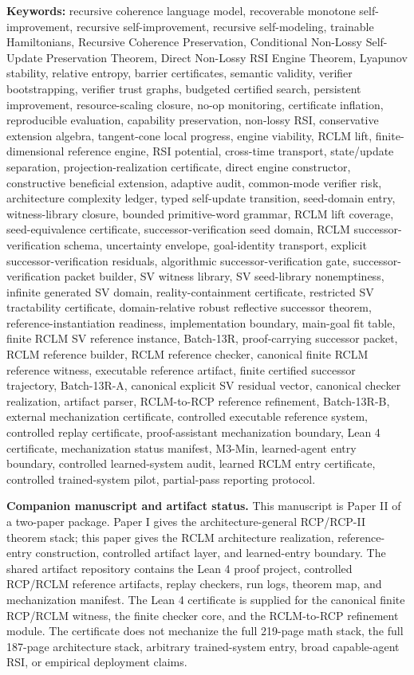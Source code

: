 \documentclass[11pt,a4paper]{article}
\begin{document}
\textbf{Keywords:} recursive coherence language model, recoverable monotone self-improvement, recursive self-improvement, recursive self-modeling, trainable Hamiltonians, Recursive Coherence Preservation, Conditional Non-Lossy Self-Update Preservation Theorem, Direct Non-Lossy RSI Engine Theorem, Lyapunov stability, relative entropy, barrier certificates, semantic validity, verifier bootstrapping, verifier trust graphs, budgeted certified search, persistent improvement, resource-scaling closure, no-op monitoring, certificate inflation, reproducible evaluation, capability preservation, non-lossy RSI, conservative extension algebra, tangent-cone local progress, engine viability, RCLM lift, finite-dimensional reference engine, RSI potential, cross-time transport, state/update separation, projection-realization certificate, direct engine constructor, constructive beneficial extension, adaptive audit, common-mode verifier risk, architecture complexity ledger, typed self-update transition, seed-domain entry, witness-library closure, bounded primitive-word grammar, RCLM lift coverage, seed-equivalence certificate, successor-verification seed domain, RCLM successor-verification schema, uncertainty envelope, goal-identity transport, explicit successor-verification residuals, algorithmic successor-verification gate, successor-verification packet builder, SV witness library, SV seed-library nonemptiness, infinite generated SV domain, reality-containment certificate, restricted SV tractability certificate, domain-relative robust reflective successor theorem, reference-instantiation readiness, implementation boundary, main-goal fit table, finite RCLM SV reference instance, Batch-13R, proof-carrying successor packet, RCLM reference builder, RCLM reference checker, canonical finite RCLM reference witness, executable reference artifact, finite certified successor trajectory, Batch-13R-A, canonical explicit SV residual vector, canonical checker realization, artifact parser, RCLM-to-RCP reference refinement, Batch-13R-B, external mechanization certificate, controlled executable reference system, controlled replay certificate, proof-assistant mechanization boundary, Lean 4 certificate, mechanization status manifest, M3-Min, learned-agent entry boundary, controlled learned-system audit, learned RCLM entry certificate, controlled trained-system pilot, partial-pass reporting protocol.

\noindent\textbf{Companion manuscript and artifact status.}\quad
This manuscript is Paper II of a two-paper package.  Paper I gives the architecture-general RCP/RCP-II theorem stack; this paper gives the RCLM architecture realization, reference-entry construction, controlled artifact layer, and learned-entry boundary.  The shared artifact repository contains the Lean 4 proof project, controlled RCP/RCLM reference artifacts, replay checkers, run logs, theorem map, and mechanization manifest.  The Lean 4 certificate is supplied for the canonical finite RCP/RCLM witness, the finite checker core, and the RCLM-to-RCP refinement module.  The certificate does not mechanize the full 219-page math stack, the full 187-page architecture stack, arbitrary trained-system entry, broad capable-agent RSI, or empirical deployment claims.
\end{document}
